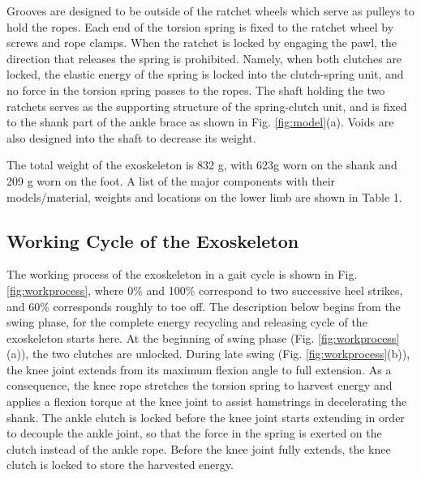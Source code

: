 \documentclass[10pt]{asme2ej}
\begin{document}
Grooves are designed to be outside of the ratchet wheels which serve as pulleys to hold the ropes.
Each end of the torsion spring is fixed to the ratchet wheel by screws and rope clamps.
When the ratchet is locked by engaging the pawl, the direction that releases the spring is prohibited. 
Namely, when both clutches are locked, the elastic energy of the spring is locked into the clutch-spring unit, and no force in the torsion spring passes to the ropes.
The shaft holding the two ratchets serves as the supporting structure of the spring-clutch unit, and is fixed to the shank part of the ankle brace as shown in Fig. \ref{fig:model}(a).
Voids are also designed into the shaft to decrease its weight.

The total weight of the exoskeleton is 832 g, with 623g worn on the shank and 209 g worn on the foot.
A list of the major components with their models/material, weights and locations on the lower limb are shown in Table 1.

\subsection{Working Cycle of the Exoskeleton}
\label{subsec:Working process}

\begin{figure*}[tb]
	\caption{The working process of the exoskeleton in a gait cycle.
	Top: elastic potential energy in the spring; middle: contacting conditions of the heel and toe with the ground, conditions of the knee and ankle clutches; bottom: schematics of working conditions of the quasi-passive exoskeleton.
	The blue arrows indicate the rotating directions of the clutches, and the black arrows indicate the directions of forces in the ropes.}
	\label{fig:workprocess}   
\end{figure*}

The working process of the exoskeleton in a gait cycle is shown in Fig. \ref{fig:workprocess}, where 0\% and 100\% correspond to two successive heel strikes, and 60\% corresponds roughly to toe off.
The description below begins from the swing phase, for the complete energy recycling and releasing cycle of the exoskeleton starts here.
At the beginning of swing phase (Fig. \ref{fig:workprocess}(a)), the two clutches are unlocked.
During late swing (Fig. \ref{fig:workprocess}(b)), the knee joint extends from its maximum flexion angle to full extension.
As a consequence, the knee rope stretches the torsion spring to harvest energy and applies a flexion torque at the knee joint to assist hamstrings in decelerating the shank.
The ankle clutch is locked before the knee joint starts extending in order to decouple the ankle joint, so that the force in the spring is exerted on the clutch instead of the ankle rope.
Before the knee joint fully extends, the knee clutch is locked to store the harvested energy.
\end{document}
